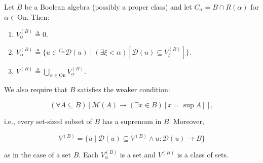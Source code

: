 Let $B$ be a Boolean algebra (possibly a proper class) and let $C_{\alpha} = B \cap R(\alpha)$ for $\alpha \in \mathrm{On}$. Then:

\begin{enumerate}
\item $V_{0}^{(B)} \triangleq 0$.
\item $V_{\alpha}^{(B)} \triangleq \{u \in {}^{C_{\alpha}} \mathcal{D}(u) \mid (\exists \xi < \alpha)[\mathcal{D}(u) \subseteq V_{\xi}^{(B)}]\}$.
\item $V^{(B)} \triangleq \bigcup_{\alpha \in \mathrm{On}} V_{\alpha}^{(B)}$.
\end{enumerate}

We also require that $B$ satisfies the weaker condition:

$$(\forall A \subseteq B)[\mathcal{M}(A) \rightarrow (\exists x \in B)[x = \sup A]],$$

i.e., every set-sized subset of $B$ has a supremum in $B$. Moreover,

$$V^{(B)} = \{u \mid \mathcal{D}(u) \subseteq V^{(B)} \land u: \mathcal{D}(u) \rightarrow B\}$$

as in the case of a set $B$. Each $V_{\alpha}^{(B)}$ is a set and $V^{(B)}$ is a class of sets.$$
